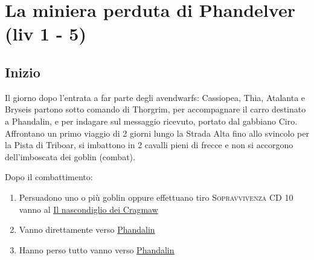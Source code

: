 \documentclass{article}
\begin{document}
\section{La miniera perduta di Phandelver (liv 1 - 5)}
\subsection{Inizio}
Il giorno dopo l'entrata a far parte degli avendwarfs: Cassiopea, Thia, Atalanta e Bryseis partono sotto comando di Thorgrim, per accompagnare il carro destinato a Phandalin, e per indagare sul messaggio ricevuto, portato dal gabbiano Ciro. Affrontano un primo viaggio di 2 giorni lungo la Strada Alta fino allo svincolo per la Pista di Triboar, si imbattono in 2 cavalli pieni di frecce e non si accorgono dell'imboscata dei goblin (combat).

Dopo il combattimento: 
    \begin{enumerate}
        \item Persuadono uno o più goblin oppure effettuano tiro \textsc{Sopravvivenza} CD 10 vanno al \hyperlink{cragmaw}{Il nascondiglio dei Cragmaw}
        \item Vanno direttamente verso \hyperlink{phandlin}{Phandalin}
        \item Hanno perso tutto vanno verso \hyperlink{phandalin}{Phandalin}
    \end{enumerate}
\end{document}
